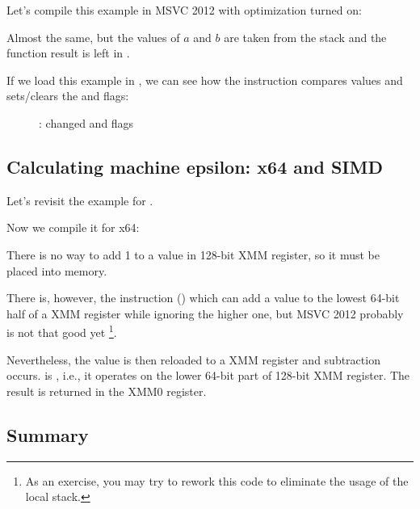 Let's compile this example in MSVC 2012 with optimization turned on:



Almost the same, but the values of $a$ and $b$ are taken from the stack and the function result 
is left in .

If we load this example in \olly, 
we can see how the  instruction compares values and sets/clears the \CF and \PF flags:

\begin{figure}[H]
\centering
{}
\caption{\olly:  changed \CF and \PF flags}
\label{fig:FPU_SIMD_d_max_olly}
\end{figure}

\subsection{Calculating machine epsilon: x64 and SIMD}
\label{machine_epsilon_x64_and_SIMD}

Let's revisit the  example for \Tdouble {}.

Now we compile it for x64:



There is no way to add 1 to a value in 128-bit XMM register, so it must be placed into memory.

There is, however, the  instruction () 
which can add a value to the lowest 64-bit half of a XMM register while ignoring the higher one, 
but MSVC 2012 probably is not that good yet
\footnote{As an exercise, you may try to rework this code to 
eliminate the usage of the local stack.}.

Nevertheless, the value is then reloaded to a XMM register and subtraction occurs.
 is , 
i.e., it operates on the lower 64-bit part of 128-bit XMM register.
The result is returned in the XMM0 register.



\subsection{Summary}

